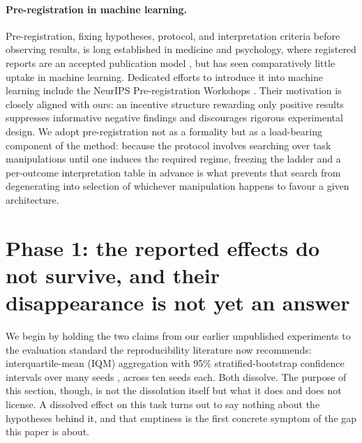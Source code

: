 \documentclass[10pt]{article}
\begin{document}
\paragraph{Pre-registration in machine learning.} Pre-registration, fixing hypotheses,
protocol, and interpretation criteria before observing results, is long established in
medicine and psychology, where registered reports are an accepted publication model
\citep{chambers2013registered}, but has seen comparatively little uptake in machine
learning. Dedicated efforts to introduce it into machine learning include the NeurIPS
Pre-registration Workshops \citep{preregistration2020,preregistration2021}. Their motivation
is closely aligned with ours: an incentive structure rewarding only positive results
suppresses informative negative findings and discourages rigorous experimental design. We
adopt pre-registration not as a formality but as a load-bearing component of the method:
because the protocol involves searching over task manipulations until one induces the
required regime, freezing the ladder and a per-outcome interpretation table in advance is
what prevents that search from degenerating into selection of whichever manipulation happens
to favour a given architecture.

\section{Phase 1: the reported effects do not survive, and their disappearance is not yet an answer}
\label{sec:phase1}

We begin by holding the two claims from our earlier unpublished experiments to the
evaluation standard the reproducibility literature now recommends: interquartile-mean (IQM)
aggregation with 95\% stratified-bootstrap confidence intervals over many seeds
\citep{agarwal2021precipice}, across ten seeds each. Both dissolve. The purpose of this
section, though, is not the dissolution itself but what it does and does not license. A
dissolved effect on this task turns out to say nothing about the hypotheses behind it, and
that emptiness is the first concrete symptom of the gap this paper is about.
\end{document}
